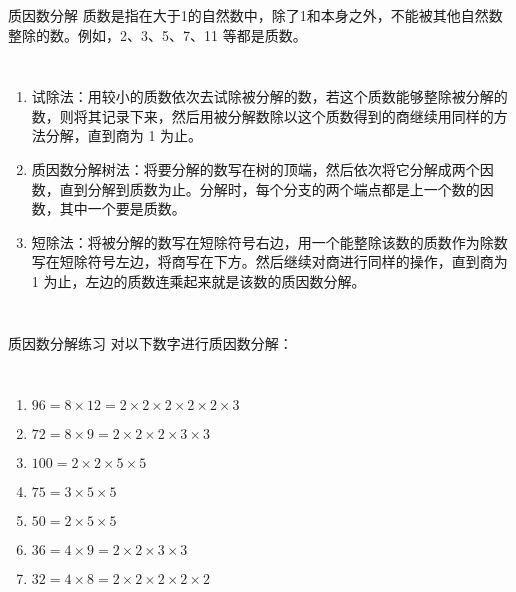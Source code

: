 \documentclass[aspectratio=169]{ctexbeamer} %
\begin{document}
\begin{frame}[t]{质因数分解}
\alert{质数}是指在\alert{大于1的自然数}中，除了\alert{1和本身}之外，\alert{不能}被其他自然数整除的数。例如，2、3、5、7、11 等都是质数。
\begin{columns}
\begin{enumerate}[label={\arabic*.}]
\item \alert{试除法：}用较小的质数依次去试除被分解的数，若这个质数能够整除被分解的数，则将其记录下来，然后用被分解数除以这个质数得到的商继续用同样的方法分解，直到商为 1 为止。
\item \alert{质因数分解树法：}将要分解的数写在树的顶端，然后依次将它分解成两个因数，直到分解到质数为止。分解时，每个分支的两个端点都是上一个数的因数，其中一个要是质数。
\item \alert{短除法：}将被分解的数写在短除符号右边，用一个能整除该数的质数作为除数写在短除符号左边，将商写在下方。然后继续对商进行同样的操作，直到商为 1 为止，左边的质数连乘起来就是该数的质因数分解。

\end{enumerate}
\end{columns}
\end{frame}

\begin{frame}[t]{质因数分解练习}
对以下数字进行质因数分解：
\begin{columns}
\begin{enumerate}[label={\arabic*.}]
\item $96  = 8 \times 12 = 2 \times 2 \times 2 \times 2 \times 2 \times 3$
\item $72  = 8 \times 9 = 2 \times 2 \times 2 \times 3 \times 3$
\item $100  = 2 \times 2 \times 5 \times 5$
\item $75  = 3 \times 5 \times 5$
\item $50  = 2 \times 5 \times 5$
\item $36  = 4 \times 9 = 2 \times 2 \times 3 \times 3$
\item $32  = 4 \times 8 = 2 \times 2 \times 2 \times 2 \times 2$
\end{enumerate}
\end{columns}
\end{frame}
\end{document}

